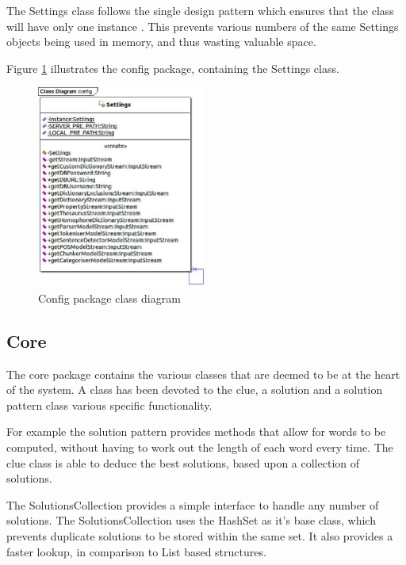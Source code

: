 The Settings class follows the single design pattern which ensures that the 
class will have only one instance \citep{gof}. This prevents various numbers of
the same Settings objects being used in memory, and thus wasting valuable space.

Figure \ref{fig:config_package} illustrates the config package, containing the 
Settings class.

\begin{figure}[H]
  \centering
  \includegraphics[width=0.5\textwidth]{class/config.jpg}
  \caption{Config package class diagram}
  \label{fig:config_package}
\end{figure}


\subsection{Core}
\label{sub:core}

The core package contains the various classes that are deemed to be at the heart
of the system. A class has been devoted to the clue, a solution and a solution 
pattern class various specific functionality.

For example the solution pattern provides methods that allow for words to be 
computed, without having to work out the length of each word every time. The 
clue class is able to deduce the best solutions, based upon a collection of 
solutions.

The SolutionsCollection provides a simple interface to handle any number of 
solutions. The SolutionsCollection uses the HashSet as it's base class, which 
prevents duplicate solutions to be stored within the same set. It also provides
a faster lookup, in comparison to List based structures.

